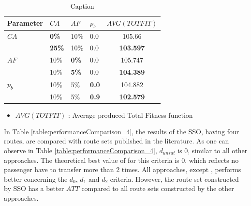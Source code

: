 \begin{table}
    \centering
    \begin{tabular}{|l|l|l|l||c|}
    \hline
    Parameter & $CA$ & $AF$ & $p_b$ & $AVG(TOTFIT)$ \\
    \hline
    $CA$ & \textbf{0\%} & 10\% & 0.0 & 105.66\\
    ~ & \textbf{25\%} & 10\% & 0.0 & \textbf{103.597}\\
    \hline
    $AF$ & 10\% & \textbf{0\%} & 0.0 & 105.747 \\
    ~ & 10\% & \textbf{5\%} & 0.0 & \textbf{104.389}\\
    \hline
    $p_b$ & 10\% & 5\% & \textbf{0.0} & 104.882\\
    ~ & 10\% & 5\% & \textbf{0.9} & \textbf{102.579}\\
    \hline
    \end{tabular}
    \caption {Caption}
    \tiny
    \begin{itemize}[noitemsep]
    \item[ ] $AVG(TOTFIT)$ : Average produced Total Fitness function
    \end{itemize}
    \label{table:pm2_inEvaluation}
\end{table}


In Table \vref{table:performanceComparison_4}, the results of the SSO, having four routes, are compared with route sets published in the literature. As one can observe in Table \vref{table:performanceComparison_4},  $d_{unsat}$ is 0, similar to all other approaches. The theoretical best value of for this criteria is 0, which reflects no passenger have to transfer more than 2 times. All approaches, except \citep{mandl79, kidwai98, chakroborty02}, performs better concerning the $d_0$, $d_1$ and $d_2$ criteria. However, the route set constructed by SSO has a better $ATT$ compared to all route sets constructed by the other approaches. 

